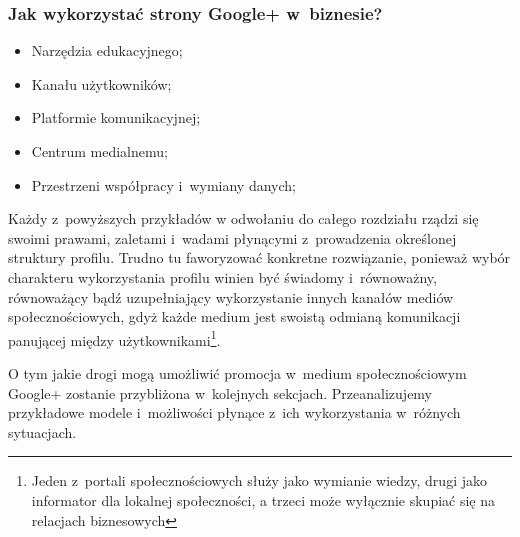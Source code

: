 \subsubsection{Jak wykorzystać strony Google+ w~biznesie?}
\parencite[s.119]{Brogan12} \lipsum[1]

\begin{itemize}
\item Narzędzia edukacyjnego;
\item Kanału użytkowników;
\item Platformie komunikacyjnej;
\item Centrum medialnemu;
\item Przestrzeni współpracy i~wymiany danych;
\end{itemize}

Każdy z~powyższych przykładów w odwołaniu do całego rozdziału \nameref{} rządzi się swoimi prawami, zaletami i~wadami płynącymi z~prowadzenia określonej struktury profilu. Trudno tu faworyzować konkretne rozwiązanie, ponieważ wybór charakteru wykorzystania profilu winien być świadomy i~równoważny, równoważący bądź uzupełniający wykorzystanie innych kanałów mediów społecznościowych, gdyż każde medium jest swoistą odmianą komunikacji panującej między użytkownikami\footnote{Jeden  z~portali społecznościowych służy jako wymianie wiedzy, drugi jako informator dla lokalnej społeczności, a trzeci może wyłącznie skupiać się na relacjach biznesowych}.

O tym jakie drogi mogą umożliwić promocja w~medium społecznościowym \mbox{Google+} zostanie przybliżona w~kolejnych sekcjach. Przeanalizujemy przykładowe modele i~możliwości płynące z~ich wykorzystania w~różnych sytuacjach.


